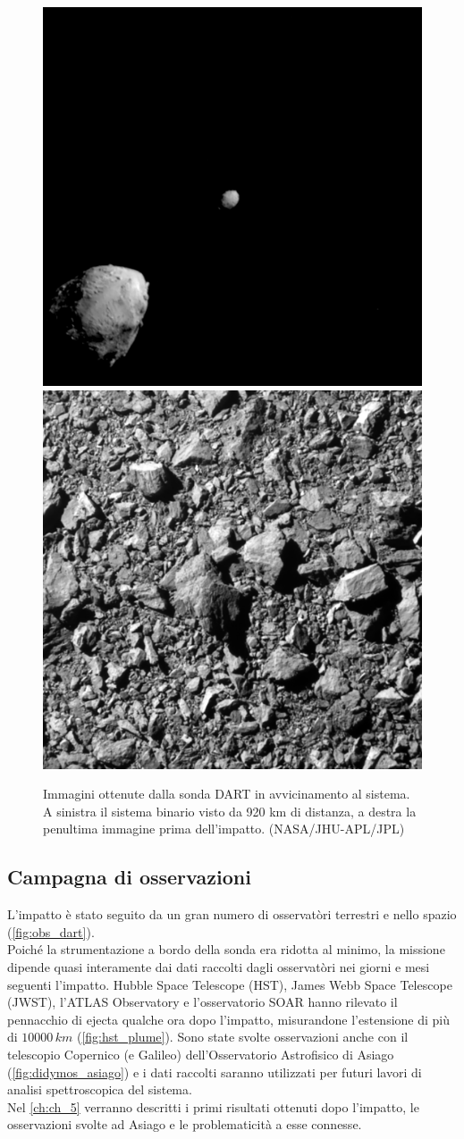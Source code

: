 \begin{figure}[!h]
\centering
	{\includegraphics[width=.48\textwidth]{figure/920.png}} \quad
	{\includegraphics[width=.48\textwidth]{figure/penultima_dart.png}}
\caption[Immagini ottenute dalla sonda DART in avvicinamento al sistema.]{Immagini ottenute dalla sonda DART in avvicinamento al sistema. A sinistra il sistema binario visto da 920 km di distanza, a destra la penultima immagine prima dell'impatto. (NASA/JHU-APL/JPL)}
\label{fig:920_penultima_dart}
\end{figure}

\subsection{Campagna di osservazioni}
L'impatto è stato seguito da un gran numero di osservatòri terrestri e nello spazio (\cref{fig:obs_dart}).\\
Poiché la strumentazione a bordo della sonda era ridotta al minimo, la missione dipende quasi interamente dai dati raccolti dagli osservatòri nei giorni e mesi seguenti l'impatto.
Hubble Space Telescope (HST), James Webb Space Telescope (JWST), l'ATLAS Observatory e l'osservatorio SOAR hanno rilevato il pennacchio di ejecta qualche ora dopo l'impatto, misurandone l'estensione di più di $10000\,km$ (\cref{fig:hst_plume}). Sono state svolte osservazioni anche con il telescopio Copernico (e Galileo) dell'Osservatorio Astrofisico di Asiago (\cref{fig:didymos_asiago}) e i dati raccolti saranno utilizzati per futuri lavori di analisi spettroscopica del sistema.\\
Nel \cref{ch:ch_5} verranno descritti i primi risultati ottenuti dopo l'impatto, le osservazioni svolte ad Asiago e le problematicità a esse connesse.

